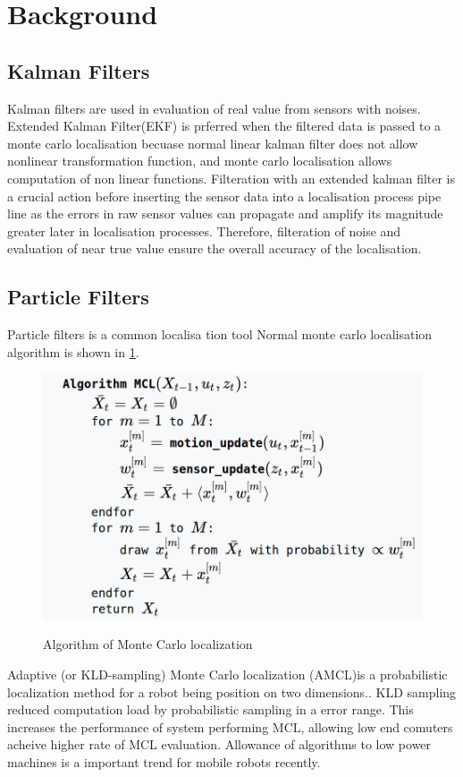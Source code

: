 \documentclass[10pt,journal,compsoc]{IEEEtran}
\begin{document}
\section{Background}

\subsection{Kalman Filters}
Kalman filters are used in evaluation of real value from sensors with noises. Extended Kalman Filter(EKF) is prferred when the filtered data is passed to a monte carlo localisation becuase normal linear kalman filter does not allow nonlinear transformation function, and monte carlo localisation allows computation of non linear functions. 
Filteration with an extended kalman filter is a crucial action before inserting the sensor data into a localisation process pipe line as the errors in raw sensor values can propagate and amplify its magnitude greater later in localisation processes.
Therefore, filteration of noise and evaluation of near true value ensure the overall accuracy of the localisation.
\subsection{Particle Filters}
Particle filters is a common localisa     tion tool
Normal monte carlo localisation algorithm is shown in \ref{fig:mcl_algo}. 
\begin{figure}[thpb]
      \centering
      \includegraphics[width=\linewidth]{./img/mcl_algo.png}
      \caption{Algorithm of Monte Carlo localization}
      \label{fig:mcl_algo}
      \cite{Thrun2002}
\end{figure}
Adaptive (or KLD-sampling) Monte Carlo localization (AMCL)is a probabilistic localization method for a robot being position on two dimensions.\cite{Fox2001}.
KLD sampling reduced computation load by probabilistic sampling in a error range.\cite{Fox2001} This increases the performance of system performing MCL, allowing low end comuters acheive higher rate of MCL evaluation.
Allowance of algorithms to low power machines is a important trend for mobile robots recently.
\end{document}
